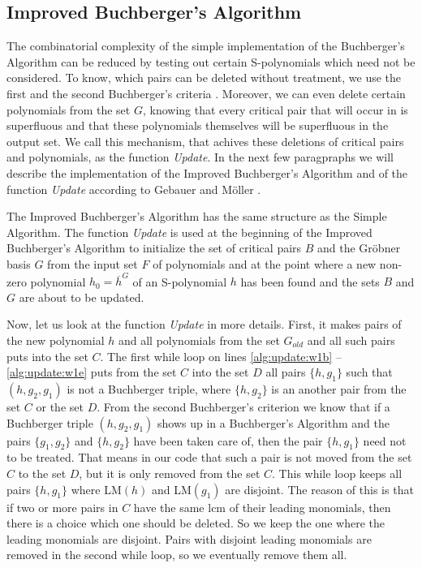 \subsection{Improved Buchberger's Algorithm}
\label{subsec:ImprovedBuchberger}
The combinatorial complexity of the simple implementation of the Buchberger's Algorithm can be reduced by testing out certain S-polynomials which need not be considered. To know, which pairs can be deleted without treatment, we use the first and the second Buchberger's criteria \cite{Becker93}. Moreover, we can even delete certain polynomials from the set $G$, knowing that every critical pair that will occur in is superfluous and that these polynomials themselves will be superfluous in the output set. We call this mechanism, that achives these deletions of critical pairs and polynomials, as the function \textit{Update}.  In the next few paragpraphs we will describe the implementation of the Improved Buchberger's Algorithm and of the function \textit{Update} according to Gebauer and M\"oller \cite{Gebauer-Moller88}.

The Improved Buchberger's Algorithm has the same structure as the Simple Algorithm. The function \textit{Update} is used at the beginning of the Improved Buchberger's Algorithm to initialize the set of critical pairs $B$ and the Gr\"obner basis $G$ from the input set $F$ of polynomials and at the point where a new non-zero polynomial $h_0 = \overline{h}^G$ of an S-polynomial $h$ has been found and the sets $B$ and $G$ are about to be updated.



Now, let us look at the function \textit{Update} in more details. First, it makes pairs of the new polynomial $h$ and all polynomials from the set $G_{old}$ and all such pairs puts into the set $C$. The first while loop on lines \ref{alg:update:w1b} -- \ref{alg:update:w1e} puts from the set $C$ into the set $D$ all pairs $\{h, g_1\}$ such that $(h, g_2, g_1)$ is not a Buchberger triple, where $\{h, g_2\}$ is an another pair from the set $C$ or the set $D$. From the second Buchberger's criterion we know that if a Buchberger triple $(h, g_2, g_1)$ shows up in a Buchberger's Algorithm and the pairs $\{g_1, g_2\}$ and $\{h, g_2\}$ have been taken care of, then the pair $\{h, g_1\}$ need not to be treated. That means in our code that such a pair is not moved from the set $C$ to the set $D$, but it is only removed from the set $C$. This while loop keeps all pairs $\{h, g_1\}$ where LM$(h)$ and LM$(g_1)$ are disjoint. The reason of this is that if two or more pairs in $C$ have the same lcm of their leading monomials, then there is a choice which one should be deleted. So we keep the one where the leading monomials are disjoint. Pairs with disjoint leading monomials are removed in the second while loop, so we eventually remove them all.

